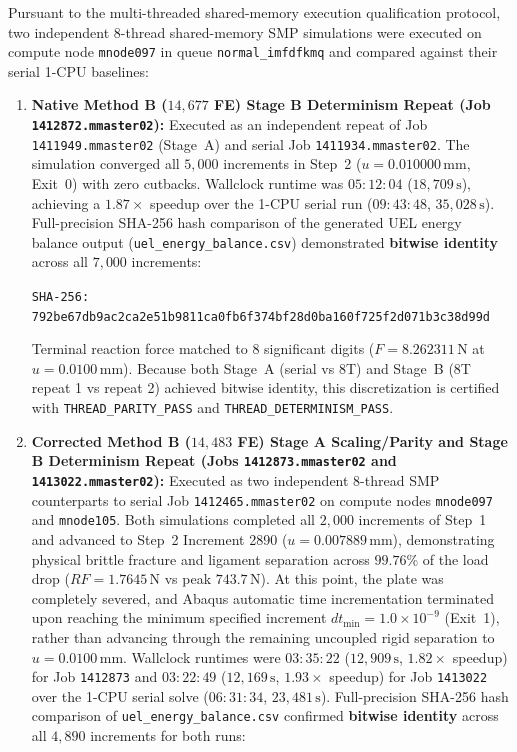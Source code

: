 Pursuant to the multi-threaded shared-memory execution qualification protocol, two independent 8-thread shared-memory SMP simulations were executed on compute node \texttt{mnode097} in queue \texttt{normal\_imfdfkmq} and compared against their serial 1-CPU baselines:
\begin{enumerate}
  \item \textbf{Native Method B ($14{,}677$ FE) Stage B Determinism Repeat (Job \texttt{1412872.mmaster02}):} Executed as an independent repeat of Job \texttt{1411949.mmaster02} (Stage~A) and serial Job \texttt{1411934.mmaster02}. The simulation converged all $5{,}000$ increments in Step~2 ($u = 0.010000\,\mathrm{mm}$, Exit~0) with zero cutbacks. Wallclock runtime was $05:12:04$ ($18{,}709\,\mathrm{s}$), achieving a $1.87\times$ speedup over the 1-CPU serial run ($09:43:48$, $35{,}028\,\mathrm{s}$). Full-precision SHA-256 hash comparison of the generated UEL energy balance output (\texttt{uel\_energy\_balance.csv}) demonstrated \textbf{bitwise identity} across all $7{,}000$ increments:
  \begin{center}
    \texttt{SHA-256: 792be67db9ac2ca2e51b9811ca0fb6f374bf28d0ba160f725f2d071b3c38d99d}
  \end{center}
  Terminal reaction force matched to 8 significant digits ($F = 8.262311\,\mathrm{N}$ at $u = 0.0100\,\mathrm{mm}$). Because both Stage~A (serial vs 8T) and Stage~B (8T repeat 1 vs repeat 2) achieved bitwise identity, this discretization is certified with \texttt{THREAD\_PARITY\_PASS} and \texttt{THREAD\_DETERMINISM\_PASS}.
  \item \textbf{Corrected Method B ($14{,}483$ FE) Stage A Scaling/Parity and Stage B Determinism Repeat (Jobs \texttt{1412873.mmaster02} and \texttt{1413022.mmaster02}):} Executed as two independent 8-thread SMP counterparts to serial Job \texttt{1412465.mmaster02} on compute nodes \texttt{mnode097} and \texttt{mnode105}. Both simulations completed all $2{,}000$ increments of Step~1 and advanced to Step~2 Increment 2890 ($u = 0.007889\,\mathrm{mm}$), demonstrating physical brittle fracture and ligament separation across $99.76\%$ of the load drop ($RF = 1.7645\,\mathrm{N}$ vs peak $743.7\,\mathrm{N}$). At this point, the plate was completely severed, and Abaqus automatic time incrementation terminated upon reaching the minimum specified increment $dt_{\min} = 1.0\times 10^{-9}$ (Exit~1), rather than advancing through the remaining uncoupled rigid separation to $u = 0.0100\,\mathrm{mm}$. Wallclock runtimes were $03:35:22$ ($12{,}909\,\mathrm{s}$, $1.82\times$ speedup) for Job \texttt{1412873} and $03:22:49$ ($12{,}169\,\mathrm{s}$, $1.93\times$ speedup) for Job \texttt{1413022} over the 1-CPU serial solve ($06:31:34$, $23{,}481\,\mathrm{s}$). Full-precision SHA-256 hash comparison of \texttt{uel\_energy_balance.csv} confirmed \textbf{bitwise identity} across all $4{,}890$ increments for both runs:

\end{enumerate}

